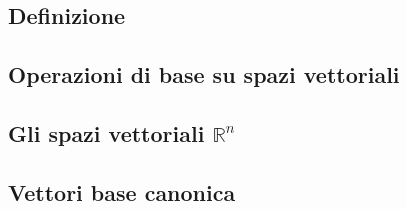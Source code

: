 \subsection{Definizione}



\subsection{Operazioni di base su spazi vettoriali}



\subsection{Gli spazi vettoriali $\mathbb{R}^n$}



\subsection{Vettori base canonica}


